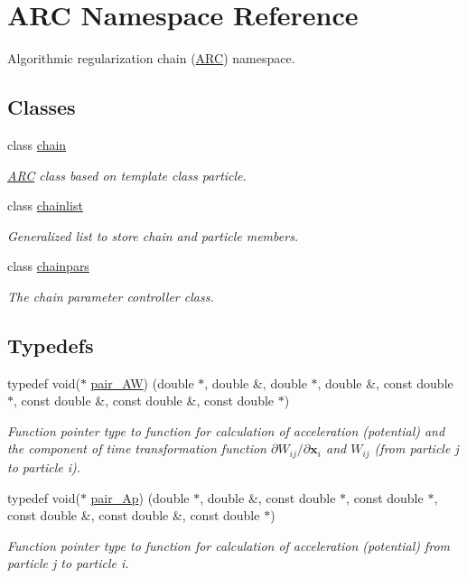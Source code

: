 \hypertarget{namespaceARC}{}\section{A\+RC Namespace Reference}
\label{namespaceARC}


Algorithmic regularization chain (\hyperlink{namespaceARC}{A\+RC}) namespace.  


\subsection*{Classes}
\begin{DoxyCompactItemize}
\item 
class \hyperlink{classARC_1_1chain}{chain}
\begin{DoxyCompactList}\small\item\em \hyperlink{namespaceARC}{A\+RC} class based on template class particle. \end{DoxyCompactList}\item 
class \hyperlink{classARC_1_1chainlist}{chainlist}
\begin{DoxyCompactList}\small\item\em Generalized list to store chain and particle members. \end{DoxyCompactList}\item 
class \hyperlink{classARC_1_1chainpars}{chainpars}
\begin{DoxyCompactList}\small\item\em The chain parameter controller class. \end{DoxyCompactList}\end{DoxyCompactItemize}
\subsection*{Typedefs}
\begin{DoxyCompactItemize}
\item 
typedef void($\ast$ \hyperlink{namespaceARC_a5c4308ca4a8d0e0ff59fdce30f00274c}{pair\+\_\+\+AW}) (double $\ast$, double \&, double $\ast$, double \&, const double $\ast$, const double \&, const double \&, const double $\ast$)
\begin{DoxyCompactList}\small\item\em Function pointer type to function for calculation of acceleration (potential) and the component of time transformation function $\partial W_{ij}/\partial \mathbf{x}_i$ and $W_{ij}$ (from particle j to particle i). \end{DoxyCompactList}\item 
typedef void($\ast$ \hyperlink{namespaceARC_aed8f19a0c6ae7dc0bb3696b337d7b9f6}{pair\+\_\+\+Ap}) (double $\ast$, double \&, const double $\ast$, const double $\ast$, const double \&, const double \&, const double $\ast$)
\begin{DoxyCompactList}\small\item\em Function pointer type to function for calculation of acceleration (potential) from particle j to particle i. \end{DoxyCompactList}\end{DoxyCompactItemize}
